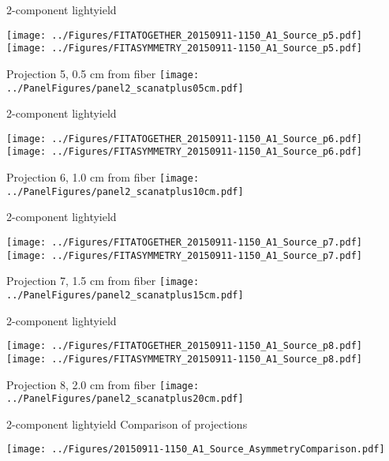 \documentclass[compress,8pt]{beamer} %
\begin{document}
\begin{frame}{2-component lightyield}
\begin{adjustwidth}{-2em}{-2em}
\texttt{[image: ../Figures/FITATOGETHER\_20150911-1150\_A1\_Source\_p5.pdf]}
\texttt{[image: ../Figures/FITASYMMETRY\_20150911-1150\_A1\_Source\_p5.pdf]}
\end{adjustwidth}
Projection 5, 0.5 cm from fiber
\hfill \texttt{[image: ../PanelFigures/panel2\_scanatplus05cm.pdf]}
\end{frame}

\begin{frame}{2-component lightyield}
\begin{adjustwidth}{-2em}{-2em}
\texttt{[image: ../Figures/FITATOGETHER\_20150911-1150\_A1\_Source\_p6.pdf]}
\texttt{[image: ../Figures/FITASYMMETRY\_20150911-1150\_A1\_Source\_p6.pdf]}
\end{adjustwidth}
Projection 6, 1.0 cm from fiber
\hfill \texttt{[image: ../PanelFigures/panel2\_scanatplus10cm.pdf]}
\end{frame}

\begin{frame}{2-component lightyield}
\begin{adjustwidth}{-2em}{-2em}
\texttt{[image: ../Figures/FITATOGETHER\_20150911-1150\_A1\_Source\_p7.pdf]}
\texttt{[image: ../Figures/FITASYMMETRY\_20150911-1150\_A1\_Source\_p7.pdf]}
\end{adjustwidth}
Projection 7, 1.5 cm from fiber
\hfill \texttt{[image: ../PanelFigures/panel2\_scanatplus15cm.pdf]}
\end{frame}

\begin{frame}{2-component lightyield}
\begin{adjustwidth}{-2em}{-2em}
\texttt{[image: ../Figures/FITATOGETHER\_20150911-1150\_A1\_Source\_p8.pdf]}
\texttt{[image: ../Figures/FITASYMMETRY\_20150911-1150\_A1\_Source\_p8.pdf]}
\end{adjustwidth}
Projection 8, 2.0 cm from fiber
\hfill \texttt{[image: ../PanelFigures/panel2\_scanatplus20cm.pdf]}
\end{frame}




\begin{frame}{2-component lightyield}
Comparison of projections
\begin{center}
\texttt{[image: ../Figures/20150911-1150\_A1\_Source\_AsymmetryComparison.pdf]}
\end{center}
\end{frame}
\end{document}
